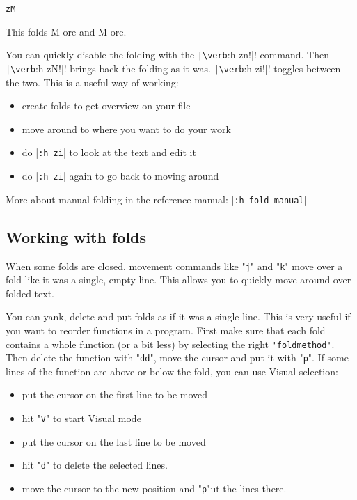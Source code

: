 \begin{Verbatim}[samepage=true]
 zM
\end{Verbatim}

This folds M-ore and M-ore.

You can quickly disable the folding with the \verb!|\verb!:h zn!|! command.
Then \verb!|\verb!:h zN!|! brings back the folding as it was.
\verb!|\verb!:h zi!|! toggles between the two.
This is a useful way of working:

\begin{itemize}
\item create folds to get overview on your file
\item move around to where you want to do your work
\item do |\verb!:h zi!| to look at the text and edit it
\item do |\verb!:h zi!| again to go back to moving around
\end{itemize}

More about manual folding in the reference manual: |\verb!:h fold-manual!|
\subsection{Working with folds}
When some folds are closed, movement commands like "\verb!j!" and "\verb!k!" move over a fold like it was a single, empty line.
This allows you to quickly move around over folded text.

You can yank, delete and put folds as if it was a single line.
This is very useful if you want to reorder functions in a program.
First make sure that each fold contains a whole function (or a bit less) by selecting the right \verb!'foldmethod'!.
Then delete the function with "\verb!dd!", move the cursor and put it with "\verb!p!".
If some lines of the function are above or below the fold, you can use Visual selection:

\begin{itemize}
\item put the cursor on the first line to be moved
\item hit "\verb!V!" to start Visual mode
\item put the cursor on the last line to be moved
\item hit "\verb!d!" to delete the selected lines.
\item move the cursor to the new position and "\verb!p!"ut the lines there.
\end{itemize}

